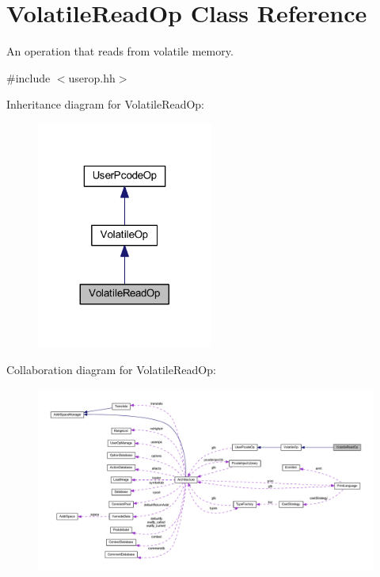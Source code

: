 \hypertarget{class_volatile_read_op}{}\section{Volatile\+Read\+Op Class Reference}
\label{class_volatile_read_op}


An operation that reads from volatile memory.  




{\ttfamily \#include $<$userop.\+hh$>$}



Inheritance diagram for Volatile\+Read\+Op\+:
\nopagebreak
\begin{figure}[H]
\begin{center}
\leavevmode
\includegraphics[width=164pt]{class_volatile_read_op__inherit__graph}
\end{center}
\end{figure}


Collaboration diagram for Volatile\+Read\+Op\+:
\nopagebreak
\begin{figure}[H]
\begin{center}
\leavevmode
\includegraphics[width=350pt]{class_volatile_read_op__coll__graph}
\end{center}
\end{figure}
